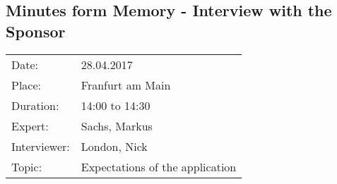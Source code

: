 \subsection*{Minutes form Memory  - Interview with the Sponsor}
\begin{tabular}{l l}
Date: & 28.04.2017 \\
Place: & Franfurt am Main \\
Duration: & 14:00 to 14:30 \\
Expert: & Sachs, Markus \\
Interviewer: & London, Nick \\
Topic: & Expectations of the application
\end{tabular}

\paragraph{}

